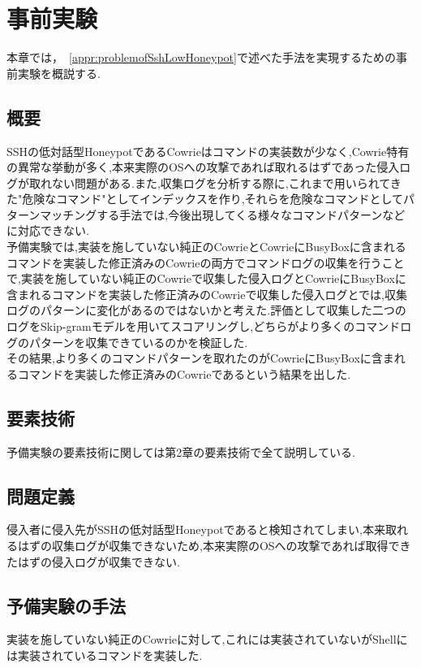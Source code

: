 \chapter{事前実験}
\label{prex}

本章では，~\ref{appr:problemofSshLowHoneypot}で述べた手法を実現するための事前実験を概説する.

\section{概要}
\label{prex:abst}
SSHの低対話型HoneypotであるCowrieはコマンドの実装数が少なく,Cowrie特有の異常な挙動が多く,本来実際のOSへの攻撃であれば取れるはずであった侵入ログが取れない問題がある.また,収集ログを分析する際に,これまで用いられてきた"危険なコマンド"としてインデックスを作り,それらを危険なコマンドとしてパターンマッチングする手法では,今後出現してくる様々なコマンドパターンなどに対応できない.\\
予備実験では,実装を施していない純正のCowrieとCowrieにBusyBoxに含まれるコマンドを実装した修正済みのCowrieの両方でコマンドログの収集を行うことで,実装を施していない純正のCowrieで収集した侵入ログとCowrieにBusyBoxに含まれるコマンドを実装した修正済みのCowrieで収集した侵入ログとでは,収集ログのパターンに変化があるのではないかと考えた.評価として収集した二つのログをSkip-gramモデルを用いてスコアリングし,どちらがより多くのコマンドログのパターンを収集できているのかを検証した.\\
その結果,より多くのコマンドパターンを取れたのがCowrieにBusyBoxに含まれるコマンドを実装した修正済みのCowrieであるという結果を出した.

\section{要素技術}
\label{prex:tech}
予備実験の要素技術に関しては第2章の要素技術で全て説明している.

\section{問題定義}
\label{prex:meth}
侵入者に侵入先がSSHの低対話型Honeypotであると検知されてしまい,本来取れるはずの収集ログが収集できないため,本来実際のOSへの攻撃であれば取得できたはずの侵入ログが収集できない.

\section{予備実験の手法}
\label{prex:appr}
実装を施していない純正のCowrieに対して,これには実装されていないがShellには実装されているコマンドを実装した.

